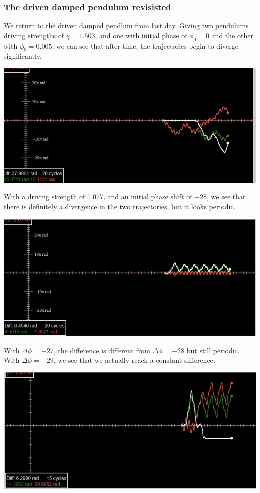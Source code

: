 \documentclass[../PHYS306Notes.tex]{subfiles}
\begin{document}
\subsubsection{The driven damped pendulum revisisted}
We return to the driven damped pendlum from last day. Giving two pendulums driving strengths of $\gamma = 1.503$, and one with initial phase of $\phi_0 = 0$ and the other with $\phi_0 = 0.005$, we can see that after time, the trajectories begin to diverge significantly.
\begin{center}
    \includegraphics[scale=0.7]{Lecture-33/l33-img1.png}
\end{center}
With a driving strength of 1.077, and an initial phase shift of $-28$, we see that there is definitely a divergence in the two trajectories, but it looks periodic. 
\begin{center}
    \includegraphics[scale=0.7]{Lecture-33/l33-img2.png}
\end{center}
With $\Delta \phi = -27$, the difference is different from $\Delta \phi = -28$ but still periodic. With $\Delta \phi = -29$, we see that we actually reach a constant difference:
\begin{center}
    \includegraphics[scale=0.7]{Lecture-33/l33-img3.png}
\end{center}
\end{document}
